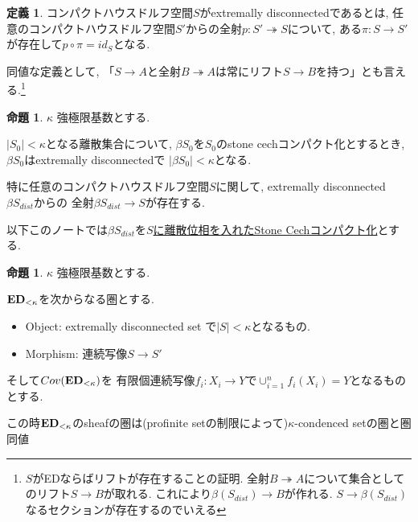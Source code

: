 \documentclass[dvipdfmx,a4paper,11pt]{article}
\theoremstyle{definition}
\newtheorem{prop}[thm]{命題}
\newtheorem{dfn}[thm]{定義}
\begin{document}
  
 \begin{tcolorbox}
 [colback = white, colframe = green!35!black, fonttitle = \bfseries,breakable = true]
\begin{dfn}\cite[Definition 2.4]{Sch19}
コンパクトハウスドルフ空間$S$がextremally disconnectedであるとは, 任意のコンパクトハウスドルフ空間$S'$からの全射$ p : S '  \twoheadrightarrow S$について, ある$\pi : S \to S'$が存在して$p \circ \pi = id_{S}$となる. 
 \end{dfn}
 \end{tcolorbox}
 
 同値な定義として, 「$S \to A$と全射$B \twoheadrightarrow A$は常にリフト$S \to B$を持つ」とも言える.\footnote{$S$がEDならばリフトが存在することの証明. 全射$B \twoheadrightarrow A$について集合としてのリフト$S \to B$が取れる. これにより$\beta(S_{dist}) \to B$が作れる. $S \to \beta(S_{dist})$なるセクションが存在するのでいえる}
 
 
   \begin{tcolorbox}
 [colback = white, colframe = green!35!black, fonttitle = \bfseries,breakable = true]
\begin{prop}\cite[Example 2.5]{Sch19}
\label{prop-sch-exa2.5}
$\kappa$ 強極限基数とする.

$|S_0| <\kappa$となる離散集合について, 
$\beta S_0$を$S_0$のstone cechコンパクト化とするとき,
 $\beta S_0$はextremally disconnectedで
$|\beta S_0 | < \kappa$となる.

特に任意のコンパクトハウスドルフ空間$S$に関して, extremally disconnected $\beta S_{dist}$からの
全射$\beta S_{dist} \to S$が存在する. 

 \end{prop}
 \end{tcolorbox}
 
 以下このノートでは$\beta S_{dist}$を\underline{$S$に離散位相を入れたStone Cechコンパクト化}とする. 
 
   \begin{tcolorbox}
 [colback = white, colframe = green!35!black, fonttitle = \bfseries,breakable = true]
\begin{prop}\cite[Example 2.5]{Sch19}
$\kappa$ 強極限基数とする.

${\bf ED}_{< \kappa}$を次からなる圏とする.
\begin{itemize}
\item Object: extremally disconnected set で$|S| < \kappa$となるもの. 
\item Morphism: 連続写像$S \to S'$
\end{itemize}

そして$Cov({\bf ED}_{< \kappa})$を
有限個連続写像$f_i : X_i \to Y$で$\cup_{i=1}^{n}f_i(X_i) =Y$となるものとする. 

この時${\bf ED}_{< \kappa}$のsheafの圏は(profinite setの制限によって)$\kappa$-condenced setの圏と圏同値
 \end{prop}
 \end{tcolorbox}
 
\end{document}
